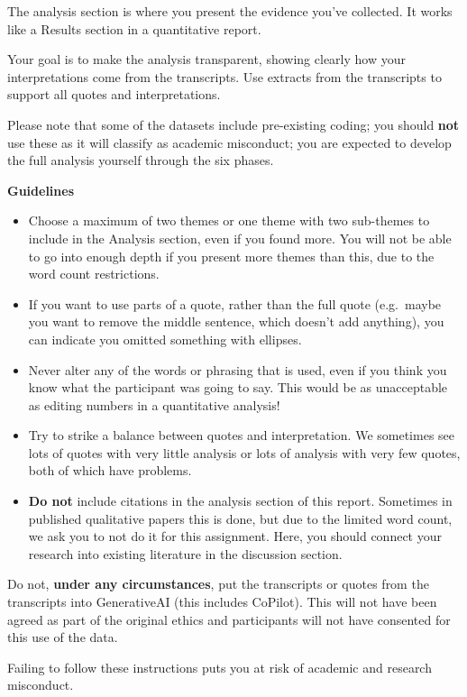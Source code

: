 \documentclass[
  english,
  letterpaper,
  DIV=11,
  numbers=noendperiod]{scrreprt}
\providecommand{\tightlist}{%
  \setlength{\itemsep}{0pt}\setlength{\parskip}{0pt}}
\begin{document}
The analysis section is where you present the evidence you've collected.
It works like a Results section in a quantitative report.

Your goal is to make the analysis transparent, showing clearly how your
interpretations come from the transcripts. Use extracts from the
transcripts to support all quotes and interpretations.

Please note that some of the datasets include pre-existing coding; you
should \textbf{not} use these as it will classify as academic
misconduct; you are expected to develop the full analysis yourself
through the six phases.

\textbf{Guidelines}

\begin{itemize}
\tightlist
\item
  Choose a maximum of two themes or one theme with two sub-themes to
  include in the Analysis section, even if you found more. You will not
  be able to go into enough depth if you present more themes than this,
  due to the word count restrictions.
\item
  If you want to use parts of a quote, rather than the full quote
  (e.g.~maybe you want to remove the middle sentence, which doesn't add
  anything), you can indicate you omitted something with ellipses.
\item
  Never alter any of the words or phrasing that is used, even if you
  think you know what the participant was going to say. This would be as
  unacceptable as editing numbers in a quantitative analysis!
\item
  Try to strike a balance between quotes and interpretation. We
  sometimes see lots of quotes with very little analysis or lots of
  analysis with very few quotes, both of which have problems.
\item
  \textbf{Do not} include citations in the analysis section of this
  report. Sometimes in published qualitative papers this is done, but
  due to the limited word count, we ask you to not do it for this
  assignment. Here, you should connect your research into existing
  literature in the discussion section.
\end{itemize}

\begin{tcolorbox}[enhanced jigsaw, breakable, bottomtitle=1mm, leftrule=.75mm, opacityback=0, colbacktitle=quarto-callout-important-color!10!white, opacitybacktitle=0.6, toprule=.15mm, colback=white, left=2mm, coltitle=black, bottomrule=.15mm, titlerule=0mm, title=\textcolor{quarto-callout-important-color}{\faExclamation}\hspace{0.5em}{Generative AI and data}, toptitle=1mm, colframe=quarto-callout-important-color-frame, arc=.35mm, rightrule=.15mm]

Do not, \textbf{under any circumstances}, put the transcripts or quotes
from the transcripts into GenerativeAI (this includes CoPilot). This
will not have been agreed as part of the original ethics and
participants will not have consented for this use of the data.

Failing to follow these instructions puts you at risk of academic and
research misconduct.

\end{tcolorbox}
\end{document}
